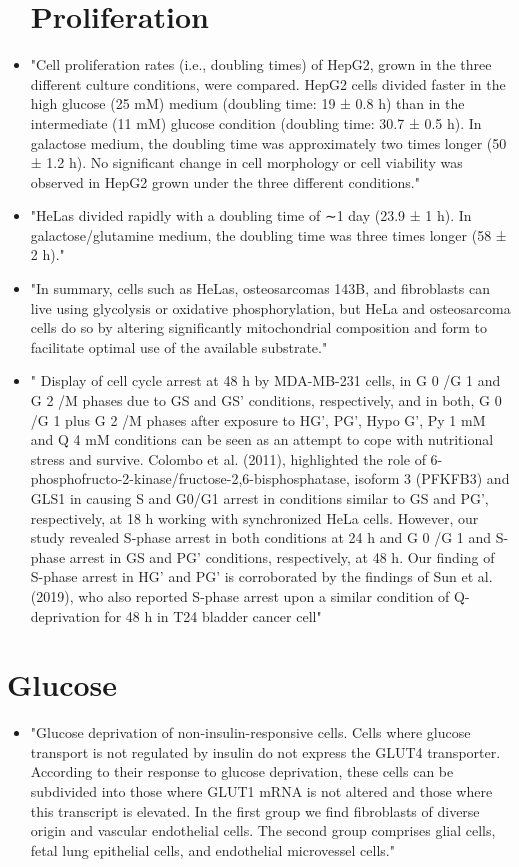 \documentclass[11pt,a4paper]{article}
\begin{document}
\begin{itemize}
\section{Proliferation}
\item "Cell proliferation rates (i.e., doubling times) of HepG2, grown in the three different culture conditions, were compared. HepG2 cells divided faster in the high glucose (25 mM) medium (doubling time: 19 ± 0.8 h) than in the intermediate (11 mM) glucose condition (doubling time: 30.7 ± 0.5 h). In galactose medium, the doubling time was approximately two times longer (50 ± 1.2 h). No significant change in cell morphology or cell viability was observed in HepG2 grown under the three different conditions."\cite{Domenis2012}
\item "HeLas divided rapidly with a doubling time of ∼1 day (23.9 ± 1 h). In galactose/glutamine medium, the doubling time was three times longer (58 ± 2 h)."\cite{Rossignol2004}
\item "In summary, cells such as HeLas, osteosarcomas 143B, and fibroblasts can live using glycolysis or oxidative phosphorylation, but HeLa and osteosarcoma cells do so by altering significantly mitochondrial composition and form to facilitate optimal use of the available substrate."\cite{Rossignol2004}
\item " Display of cell cycle arrest at 48 h
by MDA-MB-231 cells, in G 0 /G 1 and G 2 /M phases due to GS and GS’ conditions, respectively, and in both, G 0 /G 1
plus G 2 /M phases after exposure to HG’, PG’, Hypo G’, Py 1 mM and Q 4 mM conditions can be seen as an attempt to cope with nutritional stress and survive. Colombo et al.
(2011), highlighted the role of 6-phosphofructo-2-kinase/fructose-2,6-bisphosphatase, isoform 3 (PFKFB3) and GLS1
in causing S and G0/G1 arrest in conditions similar to GS and PG’, respectively, at 18 h working with synchronized HeLa cells. However, our study revealed S-phase arrest in both
conditions at 24 h and G 0 /G 1 and S-phase arrest in GS and PG’ conditions, respectively, at 48 h. Our finding of S-phase arrest in HG’ and PG’ is corroborated by the findings of
Sun et al. (2019), who also reported S-phase arrest upon a similar condition of Q-deprivation for 48 h in T24 bladder cancer cell"\cite{Prasad2023}
\end{itemize}

\section{Glucose}
\begin{itemize}
\item "Glucose deprivation of non-insulin-responsive cells. Cells where glucose transport is not regulated by insulin do not express the GLUT4 transporter. According to their response to glucose deprivation, these cells can be subdivided into those where GLUT1 mRNA is not altered and those where this transcript is elevated. In the first group we find fibroblasts of diverse origin and vascular endothelial cells. The second group comprises glial cells, fetal lung epithelial cells, and endothelial microvessel cells." \cite{Klip1994}
\end{itemize}

\newpage


\end{document}
